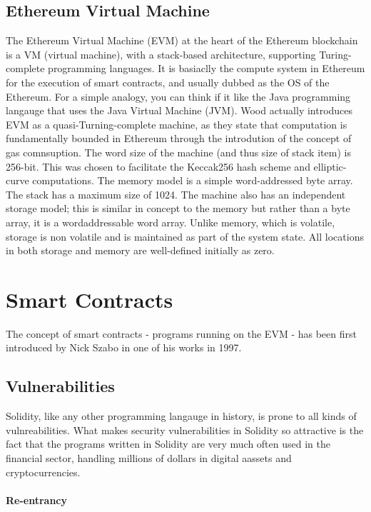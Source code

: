     \subsection{Ethereum Virtual Machine}
        
        The Ethereum Virtual Machine (EVM) at the heart of the Ethereum blockchain is a VM (virtual machine), with a stack-based architecture, supporting Turing-complete programming languages.
        It is basiaclly the compute system in Ethereum for the execution of smart contracts, and usually dubbed as the OS of the Ethereum.
        For a simple analogy, you can think if it like the Java programming langauge that uses the Java Virtual Machine (JVM).
        Wood actually introduces EVM as a quasi-Turning-complete machine, as they state that computation is fundamentally bounded in Ethereum through the introdution of the concept of gas comnsuption.
        The word size of the machine (and thus size of stack item) is 256-bit.
        This was chosen to facilitate the Keccak256 hash scheme and elliptic-curve computations.
        The memory model is a simple word-addressed byte array.
        The stack has a maximum size of 1024.
        The machine also has an independent storage model;
        this is similar in concept to the memory but rather than a byte array, it is a wordaddressable word array.
        Unlike memory, which is volatile, storage is non volatile and is maintained as part of the system state.
        All locations in both storage and memory are well-defined initially as zero.


\section{Smart Contracts}
    The concept of smart contracts - programs running on the EVM - has been first introduced by Nick Szabo in one of his works in 1997.~\cite{szabo1997formalizing}

    \subsection{Vulnerabilities}
        Solidity, like any other programming langauge in history, is prone to all kinds of vulnreabilities.
        What makes security vulnerabilities in Solidity so attractive is the fact that the programs written in Solidity are very much often used in the financial sector, handling millions of dollars in digital aassets and cryptocurrencies.


            \paragraph{Re-entrancy}
                

